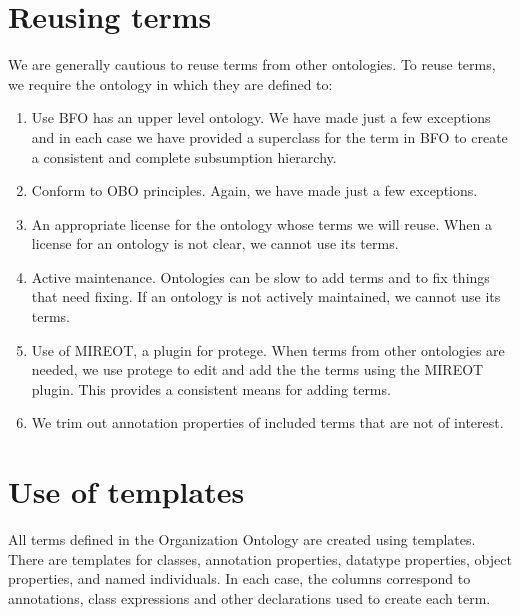 \documentclass[letterpaper,10pt,english]{sphinxmanual}
\begin{document}
\section{Reusing terms}
\label{\detokenize{ontology-authors:reusing-terms}}
\sphinxAtStartPar
We are generally cautious to reuse terms from other ontologies.  To reuse terms, we
require the ontology in which they are defined to:
\begin{enumerate}
%
\item {} 
\sphinxAtStartPar
Use BFO has an upper level ontology.  We have made just a few exceptions and
in each case we have provided a superclass for the term in BFO to create a
consistent and complete subsumption hierarchy.

\item {} 
\sphinxAtStartPar
Conform to OBO principles. Again, we have made just a few exceptions.

\item {} 
\sphinxAtStartPar
An appropriate license for the ontology whose terms we will reuse.  When a license
for an ontology is not clear, we cannot use its terms.

\item {} 
\sphinxAtStartPar
Active maintenance.  Ontologies can be slow to add terms and to fix things that
need fixing.  If an ontology is not actively maintained, we cannot use its terms.

\item {} 
\sphinxAtStartPar
Use of MIREOT, a plug\sphinxhyphen{}in for protege.  When terms from other ontologies
are needed, we use protege to edit  and add the the terms using
the MIREOT plug\sphinxhyphen{}in.  This provides a consistent means for adding terms.

\item {} 
\sphinxAtStartPar
We trim out annotation properties of included terms that are not of interest.

\end{enumerate}


\section{Use of templates}
\label{\detokenize{ontology-authors:use-of-templates}}
\sphinxAtStartPar
All terms defined in the Organization Ontology are created using templates.  There are
templates for classes, annotation properties, datatype properties, object properties,
and named individuals.  In each case, the columns correspond to annotations, class
expressions and other declarations used to create each term.
\end{document}
